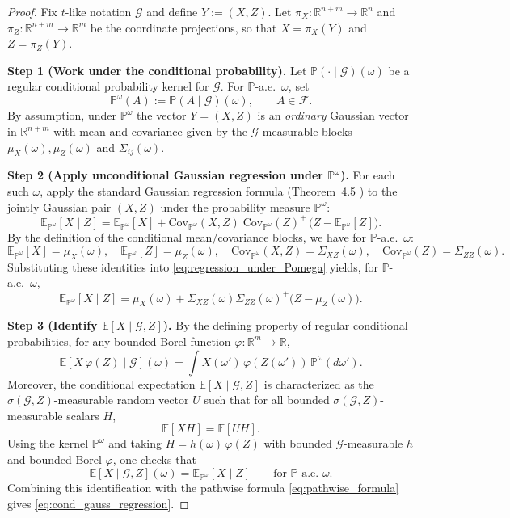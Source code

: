 \begin{proof}
Fix $t$-like notation $\mathcal G$ and define $Y:=(X,Z)$.
Let $\pi_X:\mathbb R^{n+m}\to\mathbb R^{n}$ and $\pi_Z:\mathbb R^{n+m}\to\mathbb R^{m}$
be the coordinate projections, so that $X=\pi_X(Y)$ and $Z=\pi_Z(Y)$.

\medskip
\noindent\textbf{Step 1 (Work under the conditional probability).}
Let $\mathbb P(\cdot\mid \mathcal G)(\omega)$ be a regular conditional probability kernel for $\mathcal G$.
For $\mathbb P$-a.e.\ $\omega$, set
\[
\mathbb P^\omega(A):=\mathbb P(A\mid \mathcal G)(\omega),\qquad A\in\mathcal F.
\]
By assumption, under $\mathbb P^\omega$ the vector $Y=(X,Z)$ is an \emph{ordinary} Gaussian vector in
$\mathbb R^{n+m}$ with mean and covariance given by the $\mathcal G$-measurable blocks
$\mu_X(\omega),\mu_Z(\omega)$ and $\Sigma_{ij}(\omega)$.

\medskip
\noindent\textbf{Step 2 (Apply unconditional Gaussian regression under $\mathbb P^\omega$).}
For each such $\omega$, apply the standard Gaussian regression formula (Theorem~4.5 )
to the jointly Gaussian pair $(X,Z)$ under the probability measure $\mathbb P^\omega$:
\begin{equation}\label{eq:regression_under_Pomega}
\mathbb E_{\mathbb P^\omega}[X\mid Z]
=
\mathbb E_{\mathbb P^\omega}[X]
+
\mathrm{Cov}_{\mathbb P^\omega}(X,Z)\;
\mathrm{Cov}_{\mathbb P^\omega}(Z)^{+}\,
\bigl(Z-\mathbb E_{\mathbb P^\omega}[Z]\bigr).
\end{equation}
By the definition of the conditional mean/covariance blocks, we have for $\mathbb P$-a.e.\ $\omega$:
\[
\mathbb E_{\mathbb P^\omega}[X]=\mu_X(\omega),\quad
\mathbb E_{\mathbb P^\omega}[Z]=\mu_Z(\omega),\quad
\mathrm{Cov}_{\mathbb P^\omega}(X,Z)=\Sigma_{XZ}(\omega),\quad
\mathrm{Cov}_{\mathbb P^\omega}(Z)=\Sigma_{ZZ}(\omega).
\]
Substituting these identities into \eqref{eq:regression_under_Pomega} yields, for $\mathbb P$-a.e.\ $\omega$,
\begin{equation}\label{eq:pathwise_formula}
\mathbb E_{\mathbb P^\omega}[X\mid Z]
=
\mu_X(\omega)+\Sigma_{XZ}(\omega)\Sigma_{ZZ}(\omega)^{+}\bigl(Z-\mu_Z(\omega)\bigr).
\end{equation}

\medskip
\noindent\textbf{Step 3 (Identify $\mathbb E[X\mid \mathcal G,Z]$).}
By the defining property of regular conditional probabilities,
for any bounded Borel function $\varphi:\mathbb R^{m}\to\mathbb R$,
\[
\mathbb E\!\left[X\,\varphi(Z)\mid \mathcal G\right](\omega)
=
\int X(\omega')\,\varphi(Z(\omega'))\,\mathbb P^\omega(d\omega').
\]
Moreover, the conditional expectation $\mathbb E[X\mid \mathcal G,Z]$ is characterized as the
$\sigma(\mathcal G,Z)$-measurable random vector $U$ such that for all bounded
$\sigma(\mathcal G,Z)$-measurable scalars $H$,
\[
\mathbb E[XH]=\mathbb E[UH].
\]
Using the kernel $\mathbb P^\omega$ and taking $H=h(\omega)\,\varphi(Z)$ with bounded
$\mathcal G$-measurable $h$ and bounded Borel $\varphi$, one checks that
\[
\mathbb E[X\mid \mathcal G,Z](\omega)=\mathbb E_{\mathbb P^\omega}[X\mid Z]
\qquad\text{for }\mathbb P\text{-a.e.\ }\omega.
\]
Combining this identification with the pathwise formula \eqref{eq:pathwise_formula} gives
\eqref{eq:cond_gauss_regression}.


\end{proof}
